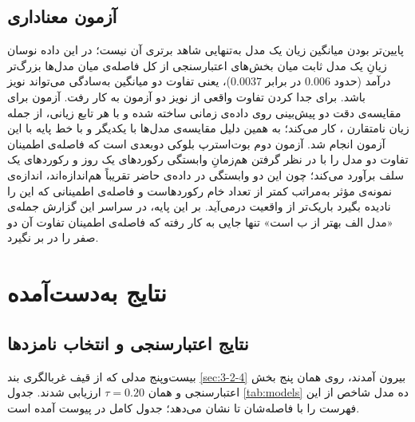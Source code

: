 \subsection{آزمون معناداری}
\label{sec:4-3-4}

پایین‌تر بودن میانگین زیان یک مدل به‌تنهایی شاهد برتری آن نیست؛ در این داده نوسان زیانِ
یک مدل ثابت میان بخش‌های اعتبارسنجی از کل فاصله‌ی میان مدل‌ها بزرگ‌تر درآمد (حدود
$0.006$ در برابر $0.0037$)، یعنی تفاوت دو میانگین به‌سادگی می‌تواند نویز باشد. برای جدا
کردن تفاوت واقعی از نویز دو آزمون به کار رفت. آزمون  برای مقایسه‌ی
دقت دو پیش‌بینی روی داده‌ی زمانی ساخته شده و با هر تابع زیانی، از جمله زیان نامتقارن
، کار می‌کند؛ به همین دلیل مقایسه‌ی مدل‌ها با یکدیگر و با خط پایه با این
آزمون انجام شد. آزمون دوم بوت‌استرپ بلوکی دوبعدی است که فاصله‌ی اطمینان تفاوت دو مدل را با در نظر گرفتن هم‌زمانِ وابستگی
رکوردهای یک روز و رکوردهای یک سلف برآورد می‌کند؛ چون این دو وابستگی در داده‌ی حاضر
تقریباً هم‌اندازه‌اند، اندازه‌ی نمونه‌ی مؤثر به‌مراتب
کمتر از تعداد خام رکوردهاست و فاصله‌ی اطمینانی که این را نادیده بگیرد باریک‌تر از واقعیت
درمی‌آید. بر این پایه، در سراسر این گزارش جمله‌ی «مدل الف بهتر از ب است» تنها جایی به
کار رفته که فاصله‌ی اطمینان تفاوت آن دو صفر را در بر نگیرد.

\section{نتایج به‌دست‌آمده}
\label{sec:4-4}

\subsection{نتایج اعتبارسنجی و انتخاب نامزدها}
\label{sec:4-4-1}

بیست‌وپنج مدلی که از قیف غربالگری بند \ref{sec:3-2-4} بیرون آمدند، روی همان پنج بخش
اعتبارسنجی و همان $\tau = 0.20$ ارزیابی شدند. جدول \ref{tab:models} ده مدل شاخص از
این فهرست را با فاصله‌شان تا  نشان می‌دهد؛ جدول کامل در پیوست آمده است.

